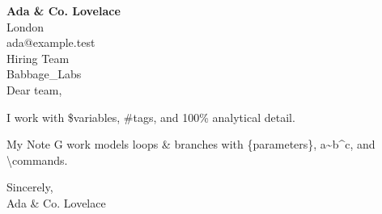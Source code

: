 \documentclass[11pt,letterpaper]{article}
\begin{document}
{\large\bfseries Ada \& Co. Lovelace}\\
London\\
ada@example.test\\[12pt]
Hiring Team\\
Babbage\_Labs\\[12pt]
Dear team,

I work with \$variables, \#tags, and 100\% analytical detail.

My Note G work models loops \& branches with \{parameters\}, a\textasciitilde{}b\textasciicircum{}c, and \textbackslash{}commands.

Sincerely,\\[10pt]
Ada \& Co. Lovelace
\end{document}
